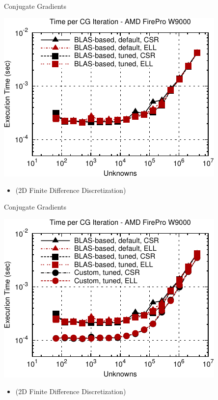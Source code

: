 \begin{frame}[fragile]{Conjugate Gradients}
 \begin{block}{}
 \begin{center}
  \vspace*{-0.5cm}
  \includegraphics[width=0.85\textwidth]{figures/cg-firepro-w9000-2}
 \end{center}

 \begin{itemize}
  \item   \vspace*{-0.3cm} {\small (2D Finite Difference Discretization)}
 \end{itemize}
 \end{block}   
\end{frame}

\begin{frame}[fragile]{Conjugate Gradients}
 \begin{block}{}
 \begin{center}
  \vspace*{-0.5cm}
  \includegraphics[width=0.85\textwidth]{figures/cg-firepro-w9000-3}
 \end{center}

 \begin{itemize}
  \item   \vspace*{-0.3cm} {\small (2D Finite Difference Discretization)}
 \end{itemize}
 \end{block}   
\end{frame}



